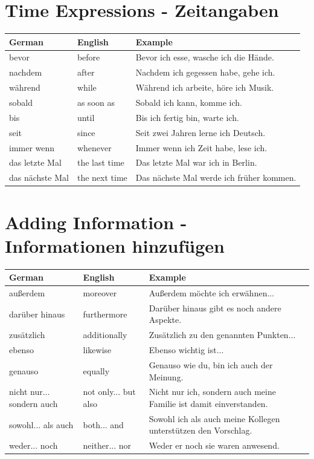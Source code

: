 \section{Time Expressions - Zeitangaben}
\label{sec:Zeitangaben}

\begin{center}
\begin{tabular}{|l|p{7cm}|p{5cm}|}
\hline
German & English & Example \\ \hline
bevor & before & Bevor ich esse, wasche ich die Hände. \\ \hline
nachdem & after & Nachdem ich gegessen habe, gehe ich. \\ \hline
während & while & Während ich arbeite, höre ich Musik. \\ \hline
sobald & as soon as & Sobald ich kann, komme ich. \\ \hline
bis & until & Bis ich fertig bin, warte ich. \\ \hline
seit & since & Seit zwei Jahren lerne ich Deutsch. \\ \hline
immer wenn & whenever & Immer wenn ich Zeit habe, lese ich. \\ \hline
das letzte Mal & the last time & Das letzte Mal war ich in Berlin. \\ \hline
das nächste Mal & the next time & Das nächste Mal werde ich früher kommen. \\ \hline
\end{tabular}
\end{center}

\section{Adding Information - Informationen hinzufügen}
\label{sec:Informationen}

\begin{center}
\begin{tabular}{|l|p{7cm}|p{5cm}|}
\hline
German & English & Example \\ \hline
außerdem & moreover & Außerdem möchte ich erwähnen... \\ \hline
darüber hinaus & furthermore & Darüber hinaus gibt es noch andere Aspekte. \\ \hline
zusätzlich & additionally & Zusätzlich zu den genannten Punkten... \\ \hline
ebenso & likewise & Ebenso wichtig ist... \\ \hline
genauso & equally & Genauso wie du, bin ich auch der Meinung. \\ \hline
nicht nur... sondern auch & not only... but also & Nicht nur ich, sondern auch meine Familie ist damit einverstanden. \\ \hline
sowohl... als auch & both... and & Sowohl ich als auch meine Kollegen unterstützen den Vorschlag. \\ \hline
weder... noch & neither... nor & Weder er noch sie waren anwesend. \\ \hline
\end{tabular}
\end{center}


